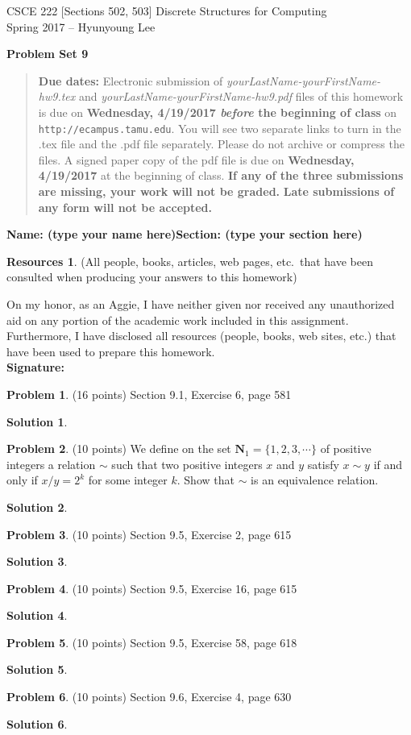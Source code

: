 \documentclass{article}
\theoremstyle{definition}
\newtheorem{problem}{Problem}
\newtheorem*{solution}{Solution}
\newtheorem*{resources}{Resources}
\newcommand{\name}[2]{\noindent\textbf{Name: #1}\hfill \textbf{Section: #2}}
\newcommand{\honor}{\noindent On my honor, as an Aggie, I have neither
  given nor received any unauthorized aid on any portion of the
  academic work included in this assignment. Furthermore, I have
  disclosed all resources (people, books, web sites, etc.) that have
  been used to prepare this homework. \\[2ex]
 \textbf{Signature:} \underline{\hspace*{8cm}} }
\newcommand{\problemset}[1]{\begin{center}\textbf{Problem Set #1}\end{center}}
\newcommand{\duedate}[2]{\begin{quote}\textbf{Due dates:} Electronic
    submission of \textsl{yourLastName-yourFirstName-hw9.tex} and 
    \textsl{yourLastName-yourFirstName-hw9.pdf} files of this homework is due on
    \textbf{#1} on \texttt{http://ecampus.tamu.edu}. You will see two separate links
    to turn in the .tex file and the .pdf file separately. Please do not archive or compress the files.  
    A signed paper copy of the pdf file is due on \textbf{#2} at the beginning of class.
    \textbf{If any of the three submissions are missing, your work will not be graded.}
    \textbf{Late submissions of any form will not be accepted.}\end{quote} }
\newcommand{\N}{\mathbf{N}}
\begin{document}
\vspace*{-18mm}
\begin{center}
{\large
CSCE 222 [Sections 502, 503] Discrete Structures for Computing\\[.5ex]
Spring 2017 -- Hyunyoung Lee\\}
\end{center}
\problemset{9}
\duedate{Wednesday, 4/19/2017 \textit{before} the beginning of class}{Wednesday, 4/19/2017}
\name{ (type your name here)}{(type your section here)}
\begin{resources} (All people, books, articles, web pages, etc.\ that
  have been consulted when producing your answers to this homework)
\end{resources}
\honor

\begin{problem} (16 points)
Section 9.1, Exercise 6, page 581
\end{problem}
\begin{solution} 
\end{solution}

\begin{problem} (10 points)
We define on the set $\N_1=\{1,2,3,\cdots\}$ of positive integers a
relation $\sim$ such that two positive integers $x$ and $y$ satisfy
$x\sim y$ if and only if $x/y=2^k$ for some integer $k$. 
Show that $\sim$ is an equivalence relation.
\end{problem}
\begin{solution} 
\end{solution}

\begin{problem} (10 points)
Section 9.5, Exercise 2, page 615
\end{problem}
\begin{solution} 
\end{solution}

\begin{problem} (10 points)
Section 9.5, Exercise 16, page 615
\end{problem}
\begin{solution} 
\end{solution}

\begin{problem} (10 points)
Section 9.5, Exercise 58, page 618
\end{problem}
\begin{solution} 
\end{solution}

\begin{problem} (10 points)
Section 9.6, Exercise 4, page 630
\end{problem}
\begin{solution} 
\end{solution}
\end{document}
